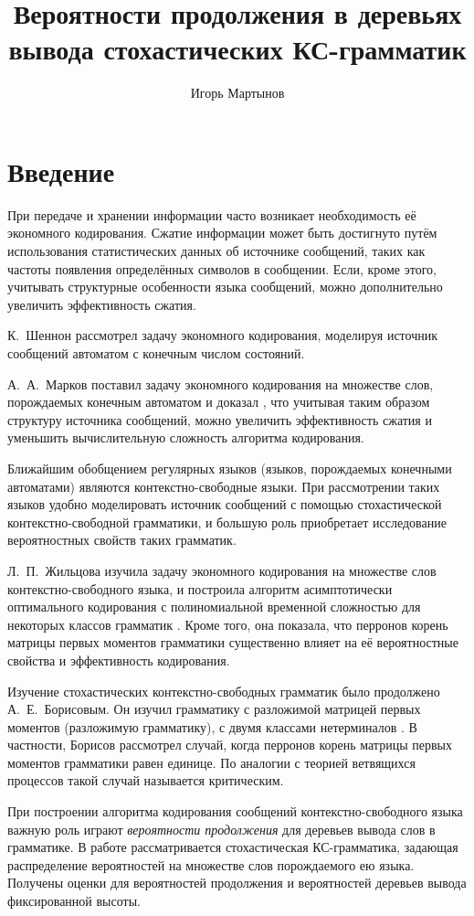 \documentclass[10pt]{article}
\title{Вероятности продолжения в деревьях вывода стохастических КС-грамматик}
\author{Игорь Мартынов}
\begin{document}
\clearpage
\tableofcontents
\newpage

\section{Введение}

При передаче и хранении информации часто возникает необходимость её экономного кодирования. Сжатие информации может быть достигнуто путём использования статистических данных об источнике сообщений, таких как частоты появления определённых символов в сообщении. Если, кроме этого, учитывать структурные особенности языка сообщений, можно дополнительно увеличить эффективность сжатия.

К.~Шеннон \cite{shennon-mts} рассмотрел задачу экономного кодирования, моделируя источник сообщений автоматом с конечным числом состояний.

А.~А.~Марков поставил задачу экономного кодирования на множестве слов, порождаемых конечным автоматом и доказал \cite{markov-coding}, что учитывая таким образом структуру источника сообщений, можно увеличить эффективность сжатия и уменьшить вычислительную сложность алгоритма кодирования.

Ближайшим обобщением регулярных языков (языков, порождаемых конечными автоматами) являются контекстно-свободные языки. При рассмотрении таких языков удобно моделировать источник сообщений с помощью стохастической контекстно-свободной грамматики, и большую роль приобретает исследование вероятностных свойств таких грамматик.

Л.~П.~Жильцова изучила задачу экономного кодирования на множестве слов контекстно-свободного языка, и построила алгоритм асимптотически оптимального кодирования с полиномиальной временной сложностью для некоторых классов грамматик \cite{zhiltsova-zakonom} \cite{zhiltsova-cost}. Кроме того, она показала, что перронов корень \cite{gantmaher-matrix-theory} матрицы первых моментов \cite{sevast-processes} грамматики существенно влияет на её вероятностные свойства и эффективность кодирования.

Изучение стохастических контекстно-свободных грамматик было продолжено А.~Е.~Борисовым. Он изучил грамматику с разложимой матрицей первых моментов (разложимую грамматику), с двумя классами нетерминалов \cite{borisov-zakonom}. В частности, Борисов рассмотрел случай, когда перронов корень матрицы первых моментов грамматики равен единице. По аналогии с теорией ветвящихся процессов такой случай называется критическим.

При построении алгоритма кодирования сообщений контекстно-свободного языка важную роль играют \textit{вероятности продолжения} для деревьев вывода слов в грамматике. В работе рассматривается стохастическая КС-грамматика, задающая распределение вероятностей на множестве слов порождаемого ею языка. Получены оценки для вероятностей продолжения и вероятностей деревьев вывода фиксированной высоты.
\end{document}
